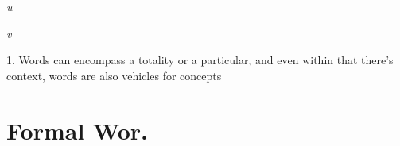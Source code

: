 \begin{multicols}{2}





\lettrine{\textit{u}}{} \\




\lettrine{\textit{v}}{} \\




1. Words can encompass a totality or a particular, and even within that there's context, words are also vehicles for concepts

\end{multicols}
\newpage

\section*{Formal Wor.}

